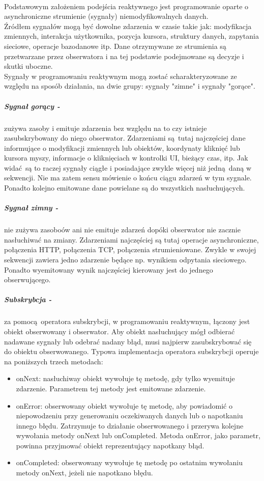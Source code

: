 \documentclass[12pt,oneside,a4paper]{report}
\begin{document}
\paragraph{}Podstawowym założeniem podejścia reaktywnego jest programowanie oparte o asynchroniczne strumienie (sygnały) niemodyfikowalnych danych.\\
Źródłem sygnałów mogą być dowolne zdarzenia w czasie takie jak: modyfikacja zmiennych, interakcja użytkownika, pozycja kursora, struktury danych, zapytania sieciowe, operacje bazodanowe itp. Dane otrzymywane ze strumienia są przetwarzane przez obserwatora i na tej podstawie podejmowane są decyzje i skutki uboczne.\\
Sygnały w programowaniu reaktywnym mogą zostać scharakteryzowane ze względu na sposób działania, na dwie grupy: sygnały "zimne" i sygnały "gorące".
\subparagraph{Sygnał gorący -}zużywa zasoby i emituje zdarzenia bez względu na to czy istnieje zasubskrybowany do niego obserwator. Zdarzeniami są tutaj najczęściej dane informujące o modyfikacji zmiennych lub obiektów, koordynaty kliknięć lub kursora myszy, informacje o kliknięciach w kontrolki UI, bieżący czas, itp. Jak widać są to raczej sygnały ciągłe i posiadające zwykle więcej niż jedną daną w sekwencji. Nie ma zatem sensu mówienie o końcu ciągu zdarzeń w tym sygnale. Ponadto kolejno emitowane dane powielane są do wszystkich nasłuchujących.
\subparagraph{Sygnał zimny -}nie zużywa zasoboów ani nie emituje zdarzeń dopóki obserwator nie zacznie nasłuchiwać na zmiany. Zdarzeniami najczęściej są tutaj operacje asynchroniczne, połączenia HTTP, połączenia TCP, połączenia strumieniowane. Zwykle w swojej sekwencji zawiera jedno zdarzenie będące np. wynikiem odpytania sieciowego. Ponadto wyemitowany wynik najczęściej kierowany jest do jednego obserwującego.
\subparagraph{Subskrybcja -}za pomocą operatora subskrybcji, w programowaniu reaktywnym, łączony jest obiekt obserwowany i obserwator. Aby obiekt nasłuchujący mógł odbierać nadawane sygnały lub odebrać nadany błąd, musi najpierw zasubskrybować się do obiektu obserwowanego. Typowa implementacja operatora subskrybcji operuje na poniższych trzech metodach:
\begin{itemize}
	\item onNext: nasłuchiway obiekt wywołuje tę metodę, gdy tylko wyemituje zdarzenie. Parametrem tej metody jest emitowane zdarzenie.
	\item onError: obserwowany obiekt wywołuje tę metodę, aby powiadomić o niepowodzeniu przy generowaniu oczekiwanych danych lub o napotkaniu innego błędu. Zatrzymuje to działanie obserwowanego i przerywa kolejne wywołania metody onNext lub onCompleted. Metoda onError, jako parametr, powinna przyjmować obiekt reprezentujący napotkany błąd.
	\item onCompleted: obserwowany wywołuje tę metodę po ostatnim wywołaniu metody onNext, jeżeli nie napotkano błędu.\\
\end{itemize}
\end{document}
